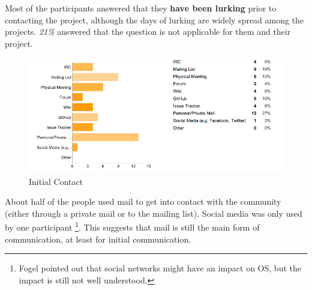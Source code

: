 Most of the participants answered that they {\bf have been lurking} prior to contacting the project, although the days of lurking are widely spread among the projects. {\it 21\%} answered that the question is not applicable for them and their project. 

\begin{figure}[ht!]
\centering
\includegraphics[width=120mm]{chapters/img/initial_contact.png}
\caption{Initial Contact }
\label{overflow}
\end{figure}

About half of the people used mail to get into contact with the community (either through a private mail or to the mailing list). Social media was only used by one participant \footnote{Fogel pointed out that social networks might have an impact on OS, but the impact is still not well understood.}. This suggests that mail is still the main form of communication, at least for initial communication.


